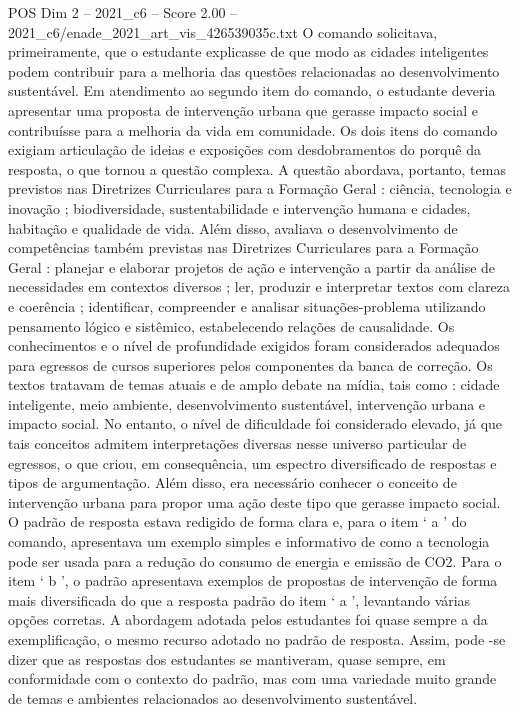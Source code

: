 \begin{textsample}{POS Dim 2 – 2021\_c6 – Score 2.00 – 2021\_c6/enade\_2021\_art\_vis\_426539035c.txt}
O comando solicitava, primeiramente, que o estudante explicasse de que modo as cidades inteligentes podem contribuir para a melhoria das questões relacionadas ao desenvolvimento sustentável.
Em atendimento ao segundo item do comando, o estudante deveria apresentar uma proposta de intervenção urbana que gerasse impacto social e contribuísse para a melhoria da vida em comunidade.
Os dois itens do comando exigiam articulação de ideias e exposições com desdobramentos do porquê da resposta, o que tornou a questão complexa.
A questão abordava, portanto, temas previstos nas Diretrizes Curriculares para a Formação Geral : ciência, tecnologia e inovação ; biodiversidade, sustentabilidade e intervenção humana e cidades, habitação e qualidade de vida.
Além disso, avaliava o desenvolvimento de competências também previstas nas Diretrizes Curriculares para a Formação Geral : planejar e elaborar projetos de ação e intervenção a partir da análise de necessidades em contextos diversos ; ler, produzir e interpretar textos com clareza e coerência ; identificar, compreender e analisar situações-problema utilizando pensamento lógico e sistêmico, estabelecendo relações de causalidade.
Os conhecimentos e o nível de profundidade exigidos foram considerados adequados para egressos de cursos superiores pelos componentes da banca de correção.
Os textos tratavam de temas atuais e de amplo debate na mídia, tais como : cidade inteligente, meio ambiente, desenvolvimento sustentável, intervenção urbana e impacto social.
No entanto, o nível de dificuldade foi considerado elevado, já que tais conceitos admitem interpretações diversas nesse universo particular de egressos, o que criou, em consequência, um espectro diversificado de respostas e tipos de argumentação.
Além disso, era necessário conhecer o conceito de intervenção urbana para propor uma ação deste tipo que gerasse impacto social.
O padrão de resposta estava redigido de forma clara e, para o item ‘ a ’ do comando, apresentava um exemplo simples e informativo de como a tecnologia pode ser usada para a redução do consumo de energia e emissão de CO2.
Para o item ‘ b ’, o padrão apresentava exemplos de propostas de intervenção de forma mais diversificada do que a resposta padrão do item ‘ a ’, levantando várias opções corretas.
A abordagem adotada pelos estudantes foi quase sempre a da exemplificação, o mesmo recurso adotado no padrão de resposta.
Assim, pode -se dizer que as respostas dos estudantes se mantiveram, quase sempre, em conformidade com o contexto do padrão, mas com uma variedade muito grande de temas e ambientes relacionados ao desenvolvimento sustentável.

\end{textsample}
